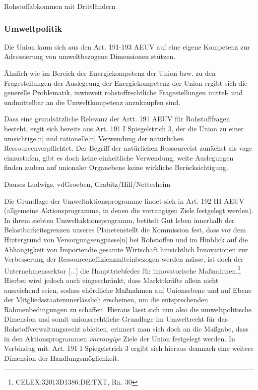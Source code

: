 \documentclass[12pt,a4paper,oneside]{book} %
\begin{document}
	Rohstoffabkommen mit Drittländern
	
	
	\subsubsection{Umweltpolitik}
	Die Union kann sich aus den Art. 191-193 AEUV auf eine eigene Kompetenz zur Adressierung von umweltbezogene Dimensionen stützen.
	
	Ähnlich wie im Bereich der Energiekompetenz der Union bzw. zu den Fragestellungen der Auslegeung der Energiekompetenz der Union ergibt sich die generelle Problematik, inwieweit rohstoffrechtliche Fragestellungen mittel- und undmittelbar an die Umweltkompetenz anzuknüpfen sind.
	
	Dass eine grundsätzliche Relevanz der Artt. 191 AEUV für Rohstofffragen besteht, ergit sich bereits aus Art. 191 I Spiegelstrich 3, der die Union zu einer \glqq umsichtige[n] und rationelle[n] Verwendung der natürlichen Ressourcen\glqq verpflichtet. Der Begriff der \glqq natürlichen Ressource\grqq ist zunächst als vage einzustufen, gibt es doch keine einheitliche Verwendung, weite Auslegungen finden zudem auf unionaler Organebene keine wirkliche Berücksichtigung. \autocite{von der Groeben/Schwarze/Hatje, AEUV Art. 191. Rn. 28} 
	
	Dauses Ludwigs, vdGroeben, Grabitz/Hilf/Nettesheim
	
	Die Grundlage der Umweltaktionsprogramme findet sich in Art. 192 III AEUV (\glqq allgemeine Aktionsprogramme, in denen die vorrangigen Ziele festgelegt werden\grqq).
	In ihrem siebten Umweltaktionsprogramm, betitelt \glqq Gut leben innerhalb der Belastbarkeitsgrenzen unseres Planeten\grqq stellt die Kommission fest, dass vor dem Hintergrund von \glqq Versorgungsengpässe[n] bei Rohstoffen und im Hinblick auf die Abhängigkeit von Importen\grqq die gesamte Wirtschaft hinsichtlich \glqq Innovationen zur Verbesserung der Ressourceneffizienz\glqq miteinbezogen werden müsse, ist doch der \glqq Unternehmenssektor [...] die Haupttriebfeder für innovatorische Maßnahmen\grqq.\footnote{CELEX:32013D1386:DE:TXT, Rn. 30} Hierbei wird jedoch auch eingeschränkt, dass Markttkräfte allein nicht ausreichend seien, sodass \glqq [b]ehördliche Maßnahmen auf Unionsebene und auf Ebene der Mitgliedsstaaten\grqq unerlässlich erscheinen, um die entsprechenden Rahmenbedingungen zu schaffen. Hieraus lässt sich nun also die umweltpolitische Dimension und somit unionsrechtliche Grundlage im Umweltrecht für das Rohstoffverwaltungsrecht ableiten, erinnert man sich doch an die Maßgabe, dass in den Aktionsprogrammen \textit{vorrangige} Ziele der Union festgelegt werden. In Verbindug mit. Art. 191 I Spiegelstrich 3 ergibt sich hieraus demnach eine weitere Dimension der Handlungsmöglichkeit.
	
\end{document}
